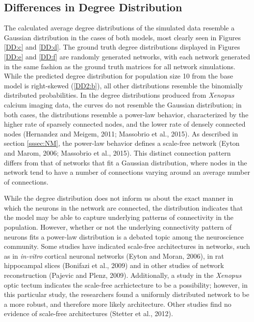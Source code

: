\documentclass[11pt,titlepage]{article}
\begin{document}
\subsection{Differences in Degree Distribution}
The calculated average degree distributions of the simulated data resemble a Gaussian distribution in the cases of both models, most clearly seen in Figures \ref{DD:c} and \ref{DD:d}. The ground truth degree distributions displayed in Figures \ref{DD:e} and \ref{DD:f} are randomly generated networks, with each network generated in the same fashion as the ground truth matrices for all network simulations. While the predicted degree distribution for population size 10 from the base model is right-skewed (\ref{DD2:b}), all other distributions resemble the binomially distributed probabilities. In the degree distributions produced from \textit{Xenopus} calcium imaging data, the curves do not resemble the Gaussian distribution; in both cases, the distributions resemble a power-law behavior, characterized by the higher rate of sparsely connected nodes, and the lower rate of densely connected nodes (Hernandez and Meigem, 2011; Massobrio et al., 2015). As described in section \ref{sssec:NM}, the power-law behavior defines a scale-free network (Eyton and Marom, 2006; Massobrio et al., 2015). This distinct connection pattern differs from that of networks that fit a Gaussian distribution, where nodes in the network tend to have a number of connections varying around an average number of connections.\par
While the degree distribution does not inform us about the exact manner in which the neurons in the network are connected, the distribution indicates that the model may be able to capture underlying patterns of connectivity in the population. However, whether or not the underlying connectivity pattern of neurons fits a power-law distribution is a debated topic among the neuroscience community. Some studies have indicated scale-free architectures in networks, such as in \textit{in-vitro} cortical neuronal networks (Eyton and Moran, 2006), in rat hippocampal slices (Bonifazi et al., 2009) and in other studies of network reconstruction (Pajevic and Plenz, 2009). Additionally, a study in the \textit{Xenopus} optic tectum indicates the scale-free acrhictecture to be a possibility; however, in this particular study, the researchers found a uniformly distributed network to be a more robust, and therefore more likely architecture. Other studies find no evidence of scale-free architectures (Stetter et al., 2012).
\end{document}
